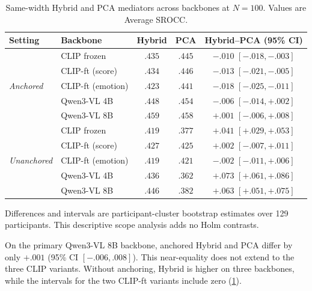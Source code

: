 \documentclass[10pt,twocolumn,letterpaper]{article}
\begin{document}
\begin{table}[!tbp]
\centering
\begin{threeparttable}
\caption{Same-width Hybrid and PCA mediators across backbones at $N=100$.
Values are Average SROCC.}
\label{tab:mediator_backbone}
\small
\begin{tabular}{llccc}
    \toprule
    Setting & Backbone & Hybrid & PCA & Hybrid--PCA (95\% CI) \\
    \midrule
    \multirow{5}{*}{\textit{Anchored}}
    & CLIP frozen       & $.435$ & $.445$ & $-.010$ $[-.018,-.003]$ \\
    & CLIP-ft (score)   & $.434$ & $.446$ & $-.013$ $[-.021,-.005]$ \\
    & CLIP-ft (emotion) & $.423$ & $.441$ & $-.018$ $[-.025,-.011]$ \\
    & Qwen3-VL 4B       & $.448$ & $.454$ & $-.006$ $[-.014,+.002]$ \\
    & Qwen3-VL 8B       & $.459$ & $.458$ & $+.001$ $[-.006,+.008]$ \\
    \midrule
    \multirow{5}{*}{\textit{Unanchored}}
    & CLIP frozen       & $.419$ & $.377$ & $+.041$ $[+.029,+.053]$ \\
    & CLIP-ft (score)   & $.427$ & $.425$ & $+.002$ $[-.007,+.011]$ \\
    & CLIP-ft (emotion) & $.419$ & $.421$ & $-.002$ $[-.011,+.006]$ \\
    & Qwen3-VL 4B       & $.436$ & $.362$ & $+.073$ $[+.061,+.086]$ \\
    & Qwen3-VL 8B       & $.446$ & $.382$ & $+.063$ $[+.051,+.075]$ \\
    \bottomrule
\end{tabular}
\begin{tablenotes}[flushleft]\footnotesize
    \item Differences and intervals are participant-cluster bootstrap estimates
    over 129 participants. This descriptive scope analysis adds no Holm contrasts.
\end{tablenotes}
\end{threeparttable}
\end{table}

On the primary Qwen3-VL 8B backbone, anchored Hybrid and PCA differ by only
$+.001$ (95\% CI $[-.006,.008]$). This near-equality does not extend to the
three CLIP variants. Without anchoring, Hybrid is higher on three backbones,
while the intervals for the two CLIP-ft variants include zero
(\cref{tab:mediator_backbone}).
\end{document}
